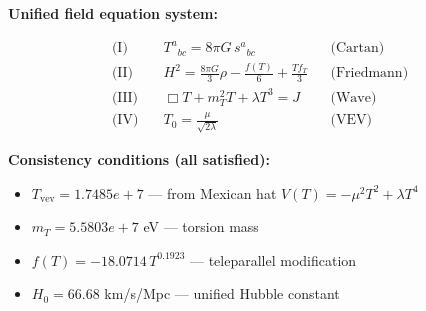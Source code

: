 
\textbf{Unified field equation system:}

\begin{align}
  \text{(I)} \quad & T^a{}_{bc} = 8\pi G \, s^a{}_{bc} && \text{(Cartan)} \\
  \text{(II)} \quad & H^2 = \frac{8\pi G}{3}\rho - \frac{f(T)}{6} + \frac{Tf_T}{3} && \text{(Friedmann)} \\
  \text{(III)} \quad & \Box T + m_T^2 T + \lambda T^3 = J && \text{(Wave)} \\
  \text{(IV)} \quad & T_0 = \frac{\mu}{\sqrt{2\lambda}} && \text{(VEV)}
\end{align}

\textbf{Consistency conditions (all satisfied):}
\begin{itemize}
  \item $T_{\text{vev}} = 1.7485e+7$ — from Mexican hat $V(T) = -\mu^2 T^2 + \lambda T^4$
  \item $m_T = 5.5803e+7$ eV — torsion mass
  \item $f(T) = -18.0714 \, T^{0.1923}$ — teleparallel modification
  \item $H_0 = 66.68$ km/s/Mpc — unified Hubble constant
\end{itemize}